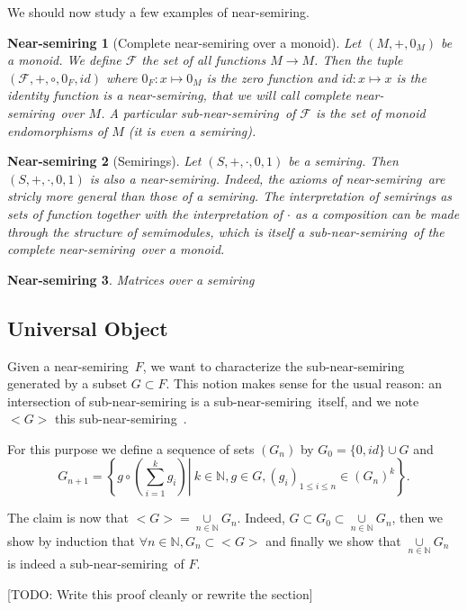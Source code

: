 \documentclass[11pt,a4paper]{article}
\newcommand{\bb}[1]{\mathbb{#1}}
\newcommand{\mcal}[1]{\mathcal{#1}}
\newcommand{\N}{\bb{N}}
\newcommand{\Ns}{near-semiring}
\newcommand{\sns}{sub-near-semiring}
\newtheorem{ns}{Near-semiring}
\theoremstyle{definition}
\renewcommand{\leq}{\leqslant}
\begin{document}
We should now study a few examples of near-semiring.

\begin{ns}[Complete near-semiring over a monoid]
\label{ns:ns_over_a_monoid}
	Let $(M,+,0_M)$ be a monoid. We define $\mcal{F}$ the set of all functions $M \to M$. Then the tuple $(\mcal{F},+,\circ,0_F,id)$ where $0_F : x \mapsto 0_M$ is the zero function and $id : x \mapsto x$ is the identity function is a near-semiring, that we will call complete \Ns\ over $M$. A particular sub-\Ns\ of $\mcal{F}$ is the set of monoid endomorphisms of $M$ (it is even a semiring).
\end{ns}

\begin{ns}[Semirings]
\label{ns:semirings}
	Let $(S,+,\cdot,0,1)$ be a semiring. Then $(S,+,\cdot,0,1)$ is also a \Ns . Indeed, the axioms of \Ns\ are stricly more general than those of a semiring. The interpretation of semirings as sets of function together with the interpretation of $\cdot$ as a composition can be made through the structure of semimodules, which is itself a sub-\Ns\ of the complete \Ns\ over a monoid.
\end{ns}

\begin{ns}{Matrices over a semiring}

\end{ns}

\subsection{Universal Object}

Given a \Ns\ $F$, we want to characterize the sub-near-semiring generated by a subset $G \subset F$. This notion makes sense for the usual reason: an intersection of sub-near-semiring is a \sns\ itself, and we note $<G>$ this \sns\ .

For this purpose we define a sequence of sets $(G_n)$ by $G_0=\{0,id\} \cup G$ and 
$$G_{n+1} = \left\{ \left. g \circ \left( \overset{k}{\underset{i=1}{\sum}} g_i \right) \right| \ k \in \N, g \in G, (g_i)_{1 \leq i \leq n} \in (G_n)^k \right\} .$$

	The claim is now that $<G> = \underset{n \in \N}{\cup} G_n$. Indeed, $G \subset G_0 \subset \underset{n \in \N}{\cup} G_n$, then we show by induction that $\forall n \in \N, G_n \subset <G>$ and finally we show that $\underset{n \in \N}{\cup} G_n$ is indeed a \sns\ of $F$.
	
	[TODO: Write this proof cleanly or rewrite the section]
\end{document}
